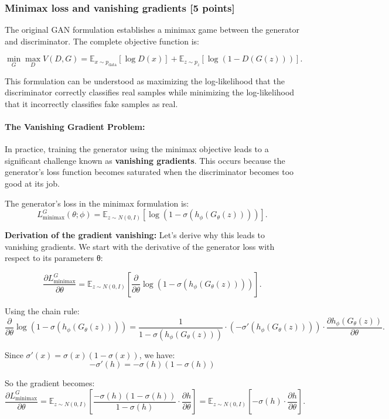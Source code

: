 \documentclass{article}
\begin{document}
\subsubsection{Minimax loss and vanishing gradients [5 points]}

The original GAN formulation establishes a minimax game between the generator and discriminator. The complete objective function is:

\[
\min_G \max_D V(D,G)=\mathbb{E}_{x\sim p_{\text{data}}}[\log D(x)] + \mathbb{E}_{z\sim p_z}[\log(1-D(G(z)))] .
\]

This formulation can be understood as maximizing the log-likelihood that the discriminator correctly classifies real samples while minimizing the log-likelihood that it incorrectly classifies fake samples as real.

\paragraph{The Vanishing Gradient Problem:} In practice, training the generator using the minimax objective leads to a significant challenge known as \textbf{vanishing gradients}. This occurs because the generator's loss function becomes saturated when the discriminator becomes too good at its job.

The generator's loss in the minimax formulation is:
\[
L_{\text{minimax}}^G (\theta; \phi) = \mathbb{E}_{z\sim N(0,I)} [\log(1 - \sigma(h_\phi(G_\theta(z))))].
\]

\textbf{Derivation of the gradient vanishing:} Let's derive why this leads to vanishing gradients. We start with the derivative of the generator loss with respect to its parameters θ:

\[
\frac{\partial L_{\text{minimax}}^G}{\partial \theta} = \mathbb{E}_{z\sim N(0,I)} \left[ \frac{\partial}{\partial \theta} \log(1 - \sigma(h_\phi(G_\theta(z)))) \right].
\]

Using the chain rule:
\[
\frac{\partial}{\partial \theta} \log(1 - \sigma(h_\phi(G_\theta(z)))) = \frac{1}{1 - \sigma(h_\phi(G_\theta(z)))} \cdot (-\sigma'(h_\phi(G_\theta(z)))) \cdot \frac{\partial h_\phi(G_\theta(z))}{\partial \theta}.
\]

Since $\sigma'(x) = \sigma(x)(1 - \sigma(x))$, we have:
\[
-\sigma'(h) = -\sigma(h)(1 - \sigma(h))
\]

So the gradient becomes:
\[
\frac{\partial L_{\text{minimax}}^G}{\partial \theta} = \mathbb{E}_{z\sim N(0,I)} \left[ \frac{-\sigma(h)(1 - \sigma(h))}{1 - \sigma(h)} \cdot \frac{\partial h}{\partial \theta} \right] = \mathbb{E}_{z\sim N(0,I)} \left[ -\sigma(h) \cdot \frac{\partial h}{\partial \theta} \right].
\]
\end{document}
